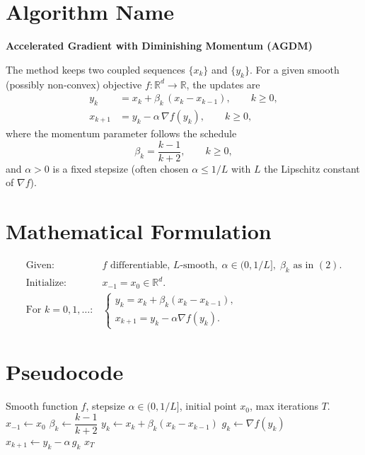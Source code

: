 \documentclass[11pt]{article}
\newcommand{\grad}{\nabla}
\begin{document}
\section*{Algorithm Name}
\textbf{Accelerated Gradient with Diminishing Momentum (AGDM)}  

The method keeps two coupled sequences $\{x_k\}$ and $\{y_k\}$.
For a given smooth (possibly non‑convex) objective $f:\mathbb{R}^d\to\mathbb{R}$,
the updates are
\[
\begin{aligned}
y_k &= x_k + \beta_k\,(x_k-x_{k-1}), \qquad k\ge 0,\\[4pt]
x_{k+1} &= y_k - \alpha\,\grad f(y_k), \qquad k\ge 0,
\end{aligned}
\tag{1}
\]
where the momentum parameter follows the schedule
\[
\beta_k = \frac{k-1}{k+2}, \qquad k\ge 0,
\tag{2}
\]
and $\alpha>0$ is a fixed stepsize (often chosen $\alpha\le 1/L$ with $L$ the Lipschitz constant of $\grad f$).

\section*{Mathematical Formulation}
\begin{align}
\text{Given: }&f\text{ differentiable, }L\text{-smooth},\; \alpha\in(0,1/L],\;
\beta_k\text{ as in }(2).\\
\text{Initialize: }&x_{-1}=x_0\in\mathbb{R}^d.\\
\text{For }k=0,1,\dots: &
\begin{cases}
y_k = x_k + \beta_k (x_k-x_{k-1}),\\[4pt]
x_{k+1}= y_k-\alpha \grad f(y_k).
\end{cases}
\end{align}

\section*{Pseudocode}
\begin{algorithm}[H]
\caption{Accelerated Gradient with Diminishing Momentum}
\begin{algorithmic}[1]
\Require Smooth function $f$, stepsize $\alpha\in(0,1/L]$, initial point $x_0$, max iterations $T$.
\State $x_{-1}\gets x_0$
    \State $\beta_k \gets \dfrac{k-1}{k+2}$               
    \State $y_k \gets x_k + \beta_k (x_k-x_{k-1})$
    \State $g_k \gets \grad f(y_k)$
    \State $x_{k+1} \gets y_k - \alpha\, g_k$
\EndFor
\State \Return $x_T$
\end{algorithmic}
\end{algorithm}
\end{document}
